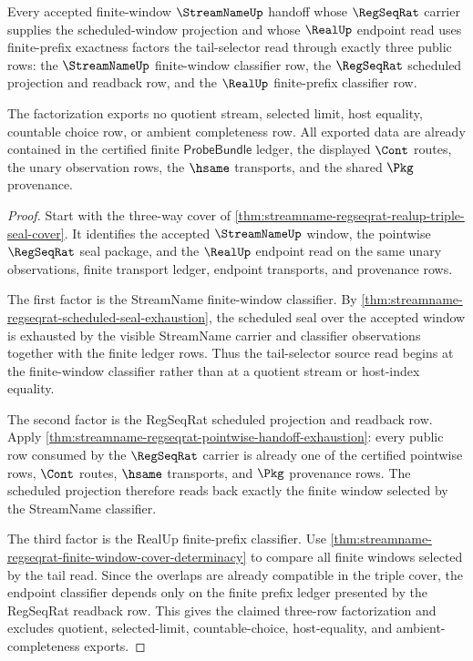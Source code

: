 \begin{theorem}
\label{thm:streamname-regseqrat-realup-tail-selector-factorization}
Every accepted finite-window $\StreamNameUp$ handoff whose $\RegSeqRat$
carrier supplies the scheduled-window projection and whose $\RealUp$ endpoint
read uses finite-prefix exactness factors the tail-selector read through exactly
three public rows: the $\StreamNameUp$ finite-window classifier row, the
$\RegSeqRat$ scheduled projection and readback row, and the $\RealUp$
finite-prefix classifier row.

The factorization exports no quotient stream, selected limit, host equality,
countable choice row, or ambient completeness row. All exported data are already
contained in the certified finite $\mathsf{ProbeBundle}$ ledger, the displayed
$\Cont$ routes, the unary observation rows, the $\hsame$ transports, and the
shared $\Pkg$ provenance.
\end{theorem}
\begin{proof}
Start with the three-way cover of
\autoref{thm:streamname-regseqrat-realup-triple-seal-cover}. It identifies the
accepted $\StreamNameUp$ window, the pointwise $\RegSeqRat$ seal package, and
the $\RealUp$ endpoint read on the same unary observations, finite transport
ledger, endpoint transports, and provenance rows.

The first factor is the StreamName finite-window classifier. By
\autoref{thm:streamname-regseqrat-scheduled-seal-exhaustion}, the scheduled
seal over the accepted window is exhausted by the visible StreamName carrier and
classifier observations together with the finite ledger rows. Thus the
tail-selector source read begins at the finite-window classifier rather than at
a quotient stream or host-index equality.

The second factor is the RegSeqRat scheduled projection and readback row. Apply
\autoref{thm:streamname-regseqrat-pointwise-handoff-exhaustion}: every public
row consumed by the $\RegSeqRat$ carrier is already one of the certified
pointwise rows, $\Cont$ routes, $\hsame$ transports, and $\Pkg$ provenance rows.
The scheduled projection therefore reads back exactly the finite window selected
by the StreamName classifier.

The third factor is the RealUp finite-prefix classifier. Use
\autoref{thm:streamname-regseqrat-finite-window-cover-determinacy} to compare
all finite windows selected by the tail read. Since the overlaps are already
compatible in the triple cover, the endpoint classifier depends only on the
finite prefix ledger presented by the RegSeqRat readback row. This gives the
claimed three-row factorization and excludes quotient, selected-limit,
countable-choice, host-equality, and ambient-completeness exports.
\end{proof}

